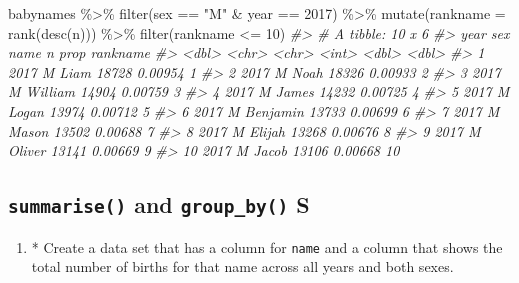 \documentclass[
]{book}
\newenvironment{Shaded}{\begin{snugshade}}{\end{snugshade}}
\newcommand{\AttributeTok}[1]{\textcolor[rgb]{0.77,0.63,0.00}{#1}}
\newcommand{\CommentTok}[1]{\textcolor[rgb]{0.56,0.35,0.01}{\textit{#1}}}
\newcommand{\DecValTok}[1]{\textcolor[rgb]{0.00,0.00,0.81}{#1}}
\newcommand{\FunctionTok}[1]{\textcolor[rgb]{0.00,0.00,0.00}{#1}}
\newcommand{\NormalTok}[1]{#1}
\newcommand{\SpecialCharTok}[1]{\textcolor[rgb]{0.00,0.00,0.00}{#1}}
\newcommand{\StringTok}[1]{\textcolor[rgb]{0.31,0.60,0.02}{#1}}
\providecommand{\tightlist}{%
  \setlength{\itemsep}{0pt}\setlength{\parskip}{0pt}}
\begin{document}
\begin{Shaded}
\begin{Highlighting}[]
\NormalTok{babynames }\SpecialCharTok{\%\textgreater{}\%} \FunctionTok{filter}\NormalTok{(sex }\SpecialCharTok{==} \StringTok{"M"} \SpecialCharTok{\&}\NormalTok{ year }\SpecialCharTok{==} \DecValTok{2017}\NormalTok{) }\SpecialCharTok{\%\textgreater{}\%}
  \FunctionTok{mutate}\NormalTok{(}\AttributeTok{rankname =} \FunctionTok{rank}\NormalTok{(}\FunctionTok{desc}\NormalTok{(n))) }\SpecialCharTok{\%\textgreater{}\%}
  \FunctionTok{filter}\NormalTok{(rankname }\SpecialCharTok{\textless{}=} \DecValTok{10}\NormalTok{)}
\CommentTok{\#\textgreater{} \# A tibble: 10 x 6}
\CommentTok{\#\textgreater{}     year sex   name         n    prop rankname}
\CommentTok{\#\textgreater{}    \textless{}dbl\textgreater{} \textless{}chr\textgreater{} \textless{}chr\textgreater{}    \textless{}int\textgreater{}   \textless{}dbl\textgreater{}    \textless{}dbl\textgreater{}}
\CommentTok{\#\textgreater{}  1  2017 M     Liam     18728 0.00954        1}
\CommentTok{\#\textgreater{}  2  2017 M     Noah     18326 0.00933        2}
\CommentTok{\#\textgreater{}  3  2017 M     William  14904 0.00759        3}
\CommentTok{\#\textgreater{}  4  2017 M     James    14232 0.00725        4}
\CommentTok{\#\textgreater{}  5  2017 M     Logan    13974 0.00712        5}
\CommentTok{\#\textgreater{}  6  2017 M     Benjamin 13733 0.00699        6}
\CommentTok{\#\textgreater{}  7  2017 M     Mason    13502 0.00688        7}
\CommentTok{\#\textgreater{}  8  2017 M     Elijah   13268 0.00676        8}
\CommentTok{\#\textgreater{}  9  2017 M     Oliver   13141 0.00669        9}
\CommentTok{\#\textgreater{} 10  2017 M     Jacob    13106 0.00668       10}
\end{Highlighting}
\end{Shaded}

\hypertarget{summarise-and-group_by-s}{%
\subsection{\texorpdfstring{\texttt{summarise()} and \texttt{group\_by()} S}{summarise() and group\_by() S}}\label{summarise-and-group_by-s}}

\begin{enumerate}
\def\labelenumi{\arabic{enumi}.}
\setcounter{enumi}{2}
\tightlist
\item
  * Create a data set that has a column for \texttt{name} and a column that shows the total number of births for that name across all years and both sexes.
\end{enumerate}
\end{document}
